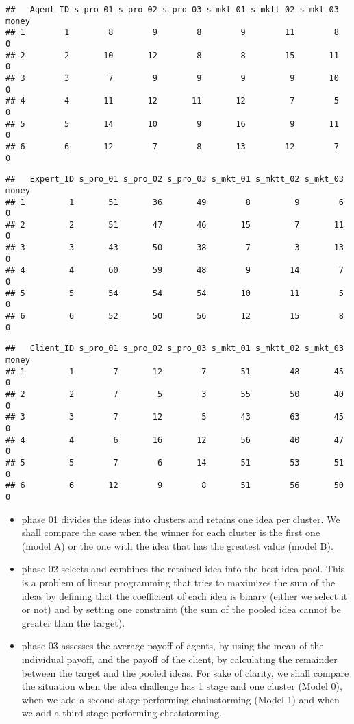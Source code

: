 \documentclass[]{elsarticle} %
\providecommand{\tightlist}{%
  \setlength{\itemsep}{0pt}\setlength{\parskip}{0pt}}
\begin{document}
\begin{verbatim}
##   Agent_ID s_pro_01 s_pro_02 s_pro_03 s_mkt_01 s_mktt_02 s_mkt_03 money
## 1        1        8        9        8        9        11        8     0
## 2        2       10       12        8        8        15       11     0
## 3        3        7        9        9        9         9       10     0
## 4        4       11       12       11       12         7        5     0
## 5        5       14       10        9       16         9       11     0
## 6        6       12        7        8       13        12        7     0
\end{verbatim}

\begin{verbatim}
##   Expert_ID s_pro_01 s_pro_02 s_pro_03 s_mkt_01 s_mktt_02 s_mkt_03 money
## 1         1       51       36       49        8         9        6     0
## 2         2       51       47       46       15         7       11     0
## 3         3       43       50       38        7         3       13     0
## 4         4       60       59       48        9        14        7     0
## 5         5       54       54       54       10        11        5     0
## 6         6       52       50       56       12        15        8     0
\end{verbatim}

\begin{verbatim}
##   Client_ID s_pro_01 s_pro_02 s_pro_03 s_mkt_01 s_mktt_02 s_mkt_03 money
## 1         1        7       12        7       51        48       45     0
## 2         2        7        5        3       55        50       40     0
## 3         3        7       12        5       43        63       45     0
## 4         4        6       16       12       56        40       47     0
## 5         5        7        6       14       51        53       51     0
## 6         6       12        9        8       51        56       50     0
\end{verbatim}

\begin{itemize}
\tightlist
\item
  phase 01 divides the ideas into clusters and retains one idea per
  cluster. We shall compare the case when the winner for each cluster is
  the first one (model A) or the one with the idea that has the greatest
  value (model B).
\item
  phase 02 selects and combines the retained idea into the best idea
  pool. This is a problem of linear programming that tries to maximizes
  the sum of the ideas by defining that the coefficient of each idea is
  binary (either we select it or not) and by setting one constraint (the
  sum of the pooled idea cannot be greater than the target).
\item
  phase 03 assesses the average payoff of agents, by using the mean of
  the individual payoff, and the payoff of the client, by calculating
  the remainder between the target and the pooled ideas. For sake of
  clarity, we shall compare the situation when the idea challenge has 1
  stage and one cluster (Model 0), when we add a second stage performing
  chainstorming (Model 1) and when we add a third stage performing
  cheatstorming.
\end{itemize}
\end{document}
